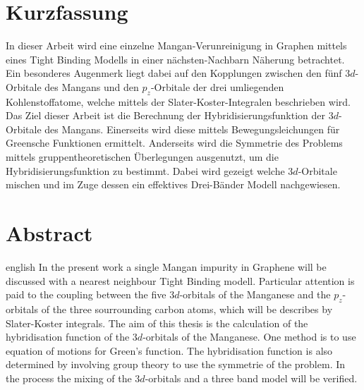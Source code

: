 \thispagestyle{plain}

\section*{Kurzfassung}
In dieser Arbeit wird eine einzelne Mangan-Verunreinigung in Graphen mittels eines Tight Binding Modells in einer nächsten-Nachbarn Näherung betrachtet.
Ein besonderes Augenmerk liegt dabei auf den Kopplungen zwischen den fünf $3d$-Orbitale des Mangans und den $p_z$-Orbitale der drei umliegenden 
Kohlenstoffatome, welche mittels der Slater-Koster-Integralen beschrieben wird.
Das Ziel dieser Arbeit ist die Berechnung der Hybridisierungsfunktion der $3d$-Orbitale des Mangans.
Einerseits wird diese mittels Bewegungsleichungen für Greensche Funktionen ermittelt.
Anderseits wird die Symmetrie des Problems mittels gruppentheoretischen Überlegungen ausgenutzt, um die Hybridisierungsfunktion zu bestimmt.
Dabei wird gezeigt welche $3d$-Orbitale mischen und im Zuge dessen ein effektives Drei-Bänder Modell nachgewiesen.
\section*{Abstract}
\begin{foreignlanguage}{english}
In the present work a single Mangan impurity in Graphene will be discussed with a nearest neighbour Tight Binding modell.
Particular attention is paid to the coupling between the five $3d$-orbitals of the Manganese and the $p_z$-orbitals of the three
sourrounding carbon atoms, which will be describes by Slater-Koster integrals.
The aim of this thesis is the calculation of the hybridisation function of the $3d$-orbitals of the Manganese.
One method is to use equation of motions for Green's function. 
The hybridisation function is also determined by involving group theory to use the symmetrie of the problem.
In the process the mixing of the $3d$-orbitals and a three band model will be verified. 
\end{foreignlanguage}